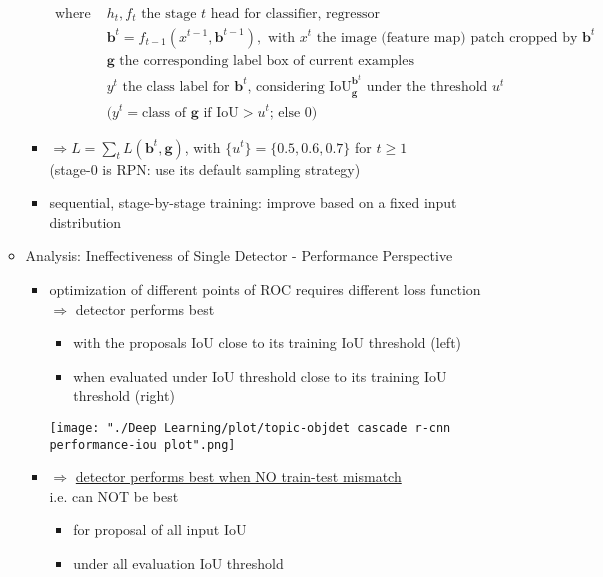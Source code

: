 \begin{itemize}
\begin{itemize}
\begin{itemize}
		\begin{align*}
		\text{where } & h_t, f_t \text{ the stage } t \text{ head for classifier, regressor} \\
		& \mathbf b^t=f_{t-1}(x^{t-1}, \mathbf b^{t-1}), \text{ with } x^t \text{ the image (feature map) patch cropped by } \mathbf b^t \\
		& \mathbf g \text{ the corresponding label box of current examples} \\
		& y^t \text{ the class label for } \mathbf b^t \text{, considering IoU}^{\mathbf b^t}_{\mathbf g} \text{ under the threshold }u^t \\
		& \text{(} y^t= \text{class of } \mathbf g \text{ if IoU}>u^t \text{; else 0)}
		\end{align*}
		\item $\displaystyle \Rightarrow L=\sum_{t} L(\mathbf b^t, \mathbf g)$, with $\{u^t\}=\{0.5, 0.6, 0.7\}$ for $t\ge1$ \\
		(stage-0 is RPN: use its default sampling strategy)
		\item sequential, stage-by-stage training: improve based on a fixed input distribution
		\end{itemize}
	\item Analysis: Ineffectiveness of Single Detector - Performance Perspective
		\begin{itemize}
		\item optimization of different points of ROC requires different loss function \\
		$\Rightarrow$ detector performs best
			\begin{itemize}
			\item with the proposals IoU close to its training IoU threshold (left)
			\item when evaluated under IoU threshold close to its training IoU threshold (right)
			\end{itemize}
		\texttt{[image: "./Deep Learning/plot/topic-objdet cascade r-cnn performance-iou plot".png]}
		\item $\Rightarrow$ \underline{detector performs best when NO train-test mismatch} \\
		i.e. can NOT be best
			\begin{itemize}
			\item for proposal of all input IoU
			\item under all evaluation IoU threshold
			\end{itemize}
		\end{itemize}

\end{itemize}
\end{itemize}
